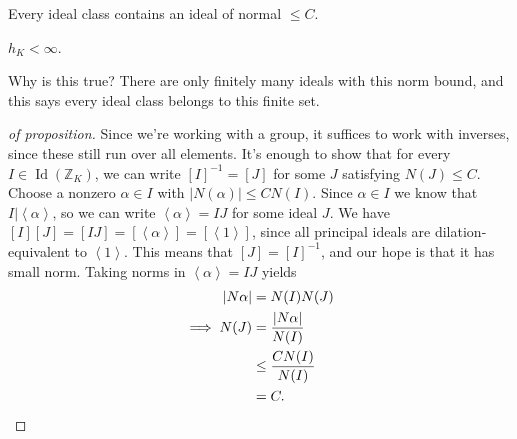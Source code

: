 \begin{proposition}[?]

Every ideal class contains an ideal of normal \(\leq C\).

\end{proposition}

\begin{corollary}[?]

\(h_K < \infty\).

\end{corollary}

\begin{remark}

Why is this true? There are only finitely many ideals with this norm
bound, and this says every ideal class belongs to this finite set.

\end{remark}

\begin{proof}[of proposition]

Since we're working with a group, it suffices to work with inverses,
since these still run over all elements. It's enough to show that for
every \(I \in \operatorname{Id}({\mathbb{Z}}_K)\), we can write
\([I]^{-1}= [J]\) for some \(J\) satisfying \(N(J) \leq C\). Choose a
nonzero \(\alpha\in I\) with
\({\left\lvert {N( \alpha )} \right\rvert}\leq C N(I)\). Since
\(\alpha\in I\) we know that
\(I \mathrel{\Big|}\left\langle{ \alpha }\right\rangle\), so we can
write \(\left\langle{ \alpha }\right\rangle = IJ\) for some ideal \(J\).
We have
\([I] [J] = [IJ] = [ \left\langle{ \alpha }\right\rangle ] = [ \left\langle{ 1 }\right\rangle ]\),
since all principal ideals are dilation-equivalent to
\(\left\langle{ 1 }\right\rangle\). This means that \([J] = [I] ^{-1}\),
and our hope is that it has small norm. Taking norms in
\(\left\langle{ \alpha }\right\rangle = IJ\) yields
\begin{align*}
{\left\lvert {N \alpha} \right\rvert} 
&= N(I) N(J) \\
\implies N(J) 
&= { {\left\lvert {N \alpha} \right\rvert} \over N(I) } \\
&\leq { C N(I) \over N(I)} \\
&= C
.\end{align*}

\end{proof}

